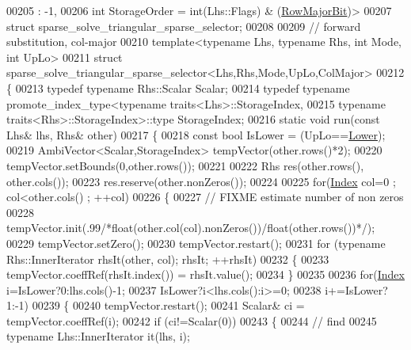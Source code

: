 \begin{DoxyCode}
00205            : -1,
00206   \textcolor{keywordtype}{int} StorageOrder = int(Lhs::Flags) & (\hyperlink{group__flags_gae4f56c2a60bbe4bd2e44c5b19cbe8762}{RowMajorBit})>
00207 \textcolor{keyword}{struct} sparse\_solve\_triangular\_sparse\_selector;
00208 
00209 \textcolor{comment}{// forward substitution, col-major}
00210 \textcolor{keyword}{template}<\textcolor{keyword}{typename} Lhs, \textcolor{keyword}{typename} Rhs, \textcolor{keywordtype}{int} Mode, \textcolor{keywordtype}{int} UpLo>
00211 \textcolor{keyword}{struct }sparse\_solve\_triangular\_sparse\_selector<Lhs,Rhs,Mode,UpLo,ColMajor>
00212 \{
00213   \textcolor{keyword}{typedef} \textcolor{keyword}{typename} Rhs::Scalar Scalar;
00214   \textcolor{keyword}{typedef} \textcolor{keyword}{typename} promote\_index\_type<typename traits<Lhs>::StorageIndex,
00215                                       \textcolor{keyword}{typename} traits<Rhs>::StorageIndex>::type StorageIndex;
00216   \textcolor{keyword}{static} \textcolor{keywordtype}{void} run(\textcolor{keyword}{const} Lhs& lhs, Rhs& other)
00217   \{
00218     \textcolor{keyword}{const} \textcolor{keywordtype}{bool} IsLower = (UpLo==\hyperlink{group__enums_gga39e3366ff5554d731e7dc8bb642f83cda891792b8ed394f7607ab16dd716f60e6}{Lower});
00219     AmbiVector<Scalar,StorageIndex> tempVector(other.rows()*2);
00220     tempVector.setBounds(0,other.rows());
00221 
00222     Rhs res(other.rows(), other.cols());
00223     res.reserve(other.nonZeros());
00224 
00225     \textcolor{keywordflow}{for}(\hyperlink{namespace_eigen_a62e77e0933482dafde8fe197d9a2cfde}{Index} col=0 ; col<other.cols() ; ++col)
00226     \{
00227       \textcolor{comment}{// FIXME estimate number of non zeros}
00228       tempVector.init(.99\textcolor{comment}{/*float(other.col(col).nonZeros())/float(other.rows())*/});
00229       tempVector.setZero();
00230       tempVector.restart();
00231       \textcolor{keywordflow}{for} (\textcolor{keyword}{typename} Rhs::InnerIterator rhsIt(other, col); rhsIt; ++rhsIt)
00232       \{
00233         tempVector.coeffRef(rhsIt.index()) = rhsIt.value();
00234       \}
00235 
00236       \textcolor{keywordflow}{for}(\hyperlink{namespace_eigen_a62e77e0933482dafde8fe197d9a2cfde}{Index} i=IsLower?0:lhs.cols()-1;
00237           IsLower?i<lhs.cols():i>=0;
00238           i+=IsLower?1:-1)
00239       \{
00240         tempVector.restart();
00241         Scalar& ci = tempVector.coeffRef(i);
00242         \textcolor{keywordflow}{if} (ci!=Scalar(0))
00243         \{
00244           \textcolor{comment}{// find}
00245           \textcolor{keyword}{typename} Lhs::InnerIterator it(lhs, i);

\end{DoxyCode}
